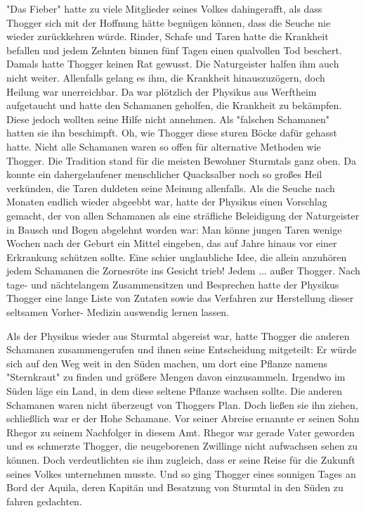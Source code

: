 \documentclass[10pt, a4paper, oneside]{book}
\begin{document}
\begin{multicols}{2}
"Das Fieber" hatte zu viele Mitglieder seines Volkes dahingerafft, als dass Thogger sich mit der Hoffnung hätte begnügen können, dass die Seuche nie wieder zurückkehren würde. Rinder, Schafe und Taren hatte die Krankheit befallen und jedem Zehnten binnen fünf Tagen einen qualvollen Tod beschert. Damals hatte Thogger keinen Rat gewusst. Die Naturgeister halfen ihm auch nicht weiter. Allenfalls gelang es ihm, die Krankheit hinauszuzögern, doch Heilung war unerreichbar. Da war plötzlich der Physikus aus Werftheim aufgetaucht und hatte den Schamanen geholfen, die Krankheit zu bekämpfen. Diese jedoch wollten seine Hilfe nicht annehmen. Als "falschen Schamanen" hatten sie ihn beschimpft. Oh, wie Thogger diese sturen Böcke dafür gehasst hatte. Nicht alle Schamanen waren so offen für alternative Methoden wie Thogger. Die Tradition stand für die meisten Bewohner Sturmtals ganz oben. Da konnte ein dahergelaufener menschlicher Quacksalber noch so großes Heil verkünden, die Taren duldeten seine Meinung allenfalls. Als die Seuche nach Monaten endlich wieder abgeebbt war, hatte der Physikus einen Vorschlag gemacht, der von allen Schamanen als eine sträfliche Beleidigung der Naturgeister in Bausch und Bogen abgelehnt worden war: Man könne jungen Taren wenige Wochen nach der Geburt ein Mittel eingeben, das auf Jahre hinaus vor einer Erkrankung schützen sollte. Eine schier unglaubliche Idee, die allein anzuhören jedem Schamanen die Zornesröte ins Gesicht trieb! Jedem ... außer Thogger. Nach tage- und nächtelangem Zusammensitzen und Besprechen hatte der Physikus Thogger eine lange Liste von Zutaten sowie das Verfahren zur Herstellung dieser seltsamen Vorher- Medizin auswendig lernen lassen.\bigskip

Als der Physikus wieder aus Sturmtal abgereist war, hatte Thogger die anderen Schamanen zusammengerufen und ihnen seine Entscheidung mitgeteilt: Er würde sich auf den Weg weit in den Süden machen, um dort eine Pflanze namens "Sternkraut" zu finden und größere Mengen davon einzusammeln. Irgendwo im Süden läge ein Land, in dem diese seltene Pflanze wachsen sollte. Die anderen Schamanen waren nicht überzeugt von Thoggers Plan. Doch ließen sie ihn ziehen, schließlich war er der Hohe Schamane. Vor seiner Abreise ernannte er seinen Sohn Rhegor zu seinem Nachfolger in diesem Amt. Rhegor war gerade Vater geworden und es schmerzte Thogger, die neugeborenen Zwillinge nicht aufwachsen sehen zu können. Doch verdeutlichten sie ihm zugleich, dass er seine Reise für die Zukunft seines Volkes unternehmen musste. Und so ging Thogger eines sonnigen Tages an Bord der Aquila, deren Kapitän und Besatzung von Sturmtal in den Süden zu fahren gedachten.\bigskip
 

\end{multicols}
\end{document}
